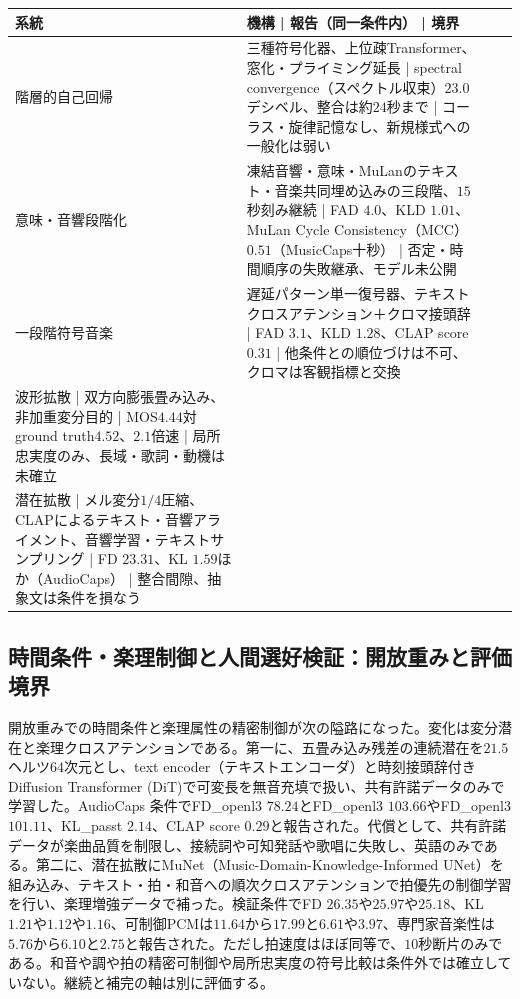 \documentclass[lualatex,a4paper,10pt]{jlreq}
\begin{document}
\begin{center}
\small
\begin{tabularx}{\textwidth}{@{}p{}p{}p{}X@{}}
\toprule
系統 & 機構 | 報告（同一条件内） | 境界 \\
\midrule
階層的自己回帰\autocite{btd063} & 三種符号化器、上位疎Transformer、窓化・プライミング延長 | spectral convergence（スペクトル収束）$23.0$デシベル、整合は約$24$秒まで | コーラス・旋律記憶なし、新規様式への一般化は弱い \\
意味・音響段階化\autocite{btd065} & 凍結音響・意味・MuLanのテキスト・音楽共同埋め込みの三段階、$15$秒刻み継続 | FAD $4.0$、KLD $1.01$、MuLan Cycle Consistency（MCC）$0.51$（MusicCaps十秒） | 否定・時間順序の失敗継承、モデル未公開 \\
一段階符号音楽\autocite{btd066} & 遅延パターン単一復号器、テキストクロスアテンション＋クロマ接頭辞 | FAD $3.1$、KLD $1.28$、CLAP score $0.31$ | 他条件との順位づけは不可、クロマは客観指標と交換 \\
波形拡散\autocite{btd064} | 双方向膨張畳み込み、非加重変分目的 | MOS$4.44$対ground truth$4.52$、$2.1$倍速 | 局所忠実度のみ、長域・歌詞・動機は未確立 \\
潜在拡散\autocite{btd067} | メル変分$1/4$圧縮、CLAPによるテキスト・音響アライメント、音響学習・テキストサンプリング | FD $23.31$、KL $1.59$ほか（AudioCaps） | 整合間隙、抽象文は条件を損なう \\
\bottomrule
\end{tabularx}
\end{center}

\subsection{時間条件・楽理制御と人間選好検証：開放重みと評価境界}
開放重みでの時間条件と楽理属性の精密制御が次の隘路になった\autocite{btd068,btd069}。変化は変分潜在と楽理クロスアテンションである\autocite{btd068,btd069}。第一に、五畳み込み残差の連続潜在を$21.5$ヘルツ$64$次元とし、text encoder（テキストエンコーダ）と時刻接頭辞付きDiffusion Transformer (DiT)で可変長を無音充填で扱い、共有許諾データのみで学習した\autocite{btd068}。AudioCaps 条件でFD\_openl3 $78.24$とFD\_openl3 $103.66$やFD\_openl3 $101.11$、KL\_passt $2.14$、CLAP score $0.29$と報告された\autocite{btd068}。代償として、共有許諾データが楽曲品質を制限し、接続詞や可知発話や歌唱に失敗し、英語のみである\autocite{btd068}。第二に、潜在拡散にMuNet（Music-Domain-Knowledge-Informed UNet）を組み込み、テキスト・拍・和音への順次クロスアテンションで拍優先の制御学習を行い、楽理増強データで補った\autocite{btd069}。検証条件でFD $26.35$や$25.97$や$25.18$、KL $1.21$や$1.12$や$1.16$、可制御PCMは$11.64$から$17.99$と$6.61$や$3.97$、専門家音楽性は$5.76$から$6.10$と$2.75$と報告された\autocite{btd069}。ただし拍速度はほぼ同等で、$10$秒断片のみである\autocite{btd069}。和音や調や拍の精密可制御や局所忠実度の符号比較は条件外では確立していない\autocite{btd069}。継続と補完の軸は別に評価する\autocite{btd068,btd069}。
\end{document}

